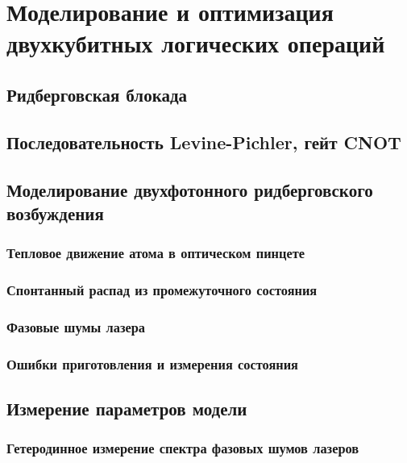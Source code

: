 \section{Моделирование и оптимизация двухкубитных логических операций}
\label{sec:chapter_4}

\subsection{Ридберговская блокада}

\subsection{Последовательность Levine-Pichler, гейт CNOT}

\subsection{Моделирование двухфотонного ридберговского возбуждения}

\subsubsection{Тепловое движение атома в оптическом пинцете}

\subsubsection{Спонтанный распад из промежуточного состояния}

\subsubsection{Фазовые шумы лазера}

\subsubsection{Ошибки приготовления и измерения состояния}

\subsection{Измерение параметров модели}

\subsubsection{Гетеродинное измерение спектра фазовых шумов лазеров}



